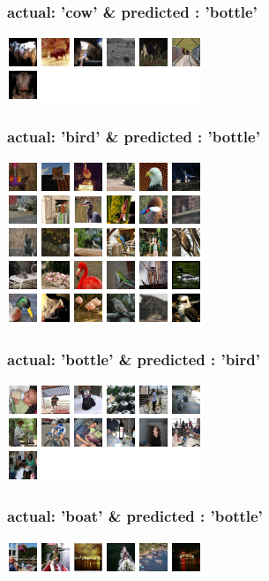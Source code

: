 \documentclass[fleqn]{article}
\begin{document}
\subsubsection{actual: 'cow' \& predicted : 'bottle'}
\includegraphics[scale=1.5]{./pics/miscallssify_cow_to_bottle.png}\\

\subsubsection{actual: 'bird' \& predicted : 'bottle'}
\includegraphics[scale=1.5]{./pics/miscallssify_bird_to_bottle.png}\\

\subsubsection{actual: 'bottle' \& predicted : 'bird'}
\includegraphics[scale=1.5]{./pics/miscallssify_bottle_to_bird.png}\\

\subsubsection{actual: 'boat' \& predicted : 'bottle'}
\includegraphics[scale=1.5]{./pics/miscallssify_boat_to_bottle.png}\\
\end{document}
